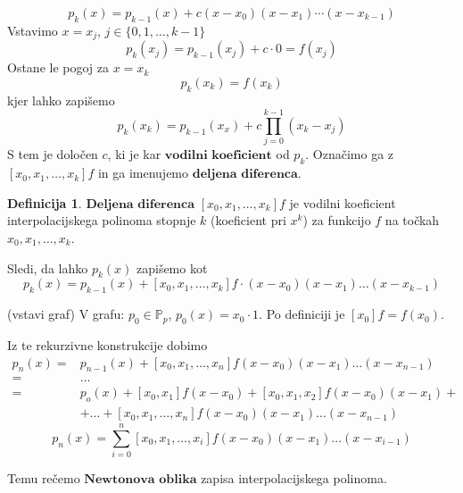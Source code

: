 \documentclass[a4paper,12pt]{article}
\theoremstyle{definition}
\newtheorem{defn}[counter]{Definicija}
\theoremstyle{remark}
\newcommand{\Pp}{\mathbb{P}}
\begin{document}
\begin{equation*}
    p_k (x) = p_{k-1}(x) + c (x-x_0)(x-x_1)\cdots(x-x_{k-1})
\end{equation*}
Vstavimo $x = x_j$, $j \in \{0, 1, \dots, k-1\}$
\begin{equation*}
    p_k(x_j) = p_{k-1}(x_j) + c \cdot 0 = f(x_j)
\end{equation*}
Ostane le pogoj za $x = x_k$
\begin{equation*}
    p_k(x_k) = f(x_k)
\end{equation*}
kjer lahko zapišemo
\begin{equation*}
    p_k(x_k) = p_{k-1}(x_x) +  c \prod_{j = 0}^{k-1}(x_k - x_j)
\end{equation*}
S tem je določen $c$, ki je kar $\textbf{vodilni koeficient}$ od $p_k$. Označimo ga z $[x_0, x_1, \dots, x_k] f$ in ga imenujemo $\textbf{deljena diferenca}$.

\begin{defn}
    $\textbf{Deljena diferenca}$  $[x_0, x_1, \dots, x_k] f$ je vodilni koeficient interpolacijskega polinoma stopnje $k$ (koeficient pri $x^k$) za funkcijo $f$ na
    točkah $x_0, x_1, \dots, x_k$.
\end{defn}

Sledi, da lahko $p_k(x)$ zapišemo kot
\begin{equation*}
    p_k(x) = p_{k-1}(x) + [x_0, x_1, \dots, x_k]f \cdot (x-x_0)(x-x_1) \dots (x-x_{k-1})
\end{equation*}

(vstavi graf)
V grafu: $p_0 \in \Pp_p$, $p_0(x) = x_0 \cdot 1$.
Po definiciji je $[x_0]f = f(x_0)$.

Iz te rekurzivne konstrukcije dobimo
\begin{align*}
    p_n(x) = & p_{n-1}(x) + [x_0, x_1, \dots, x_n] f (x-x_0)(x-x_1) \dots (x-x_{n-1}) \\
           = & \dots \\
           = & p_o(x) + [x_0, x_1] f (x-x_0) + [x_0, x_1, x_2] f (x-x_0)(x-x_1) + \\
            & + \dots + [x_0, x_1, \dots, x_n] f (x-x_0)(x-x_1) \dots (x-x_{n-1})
\end{align*}
\begin{equation*}
    p_n(x) = \sum_{i = 0}^{n}[x_0, x_1, \dots, x_i] f (x-x_0)(x-x_1)\dots(x-x_{i-1})
\end{equation*}

Temu rečemo $\textbf{Newtonova oblika}$ zapisa interpolacijskega polinoma.
\end{document}
